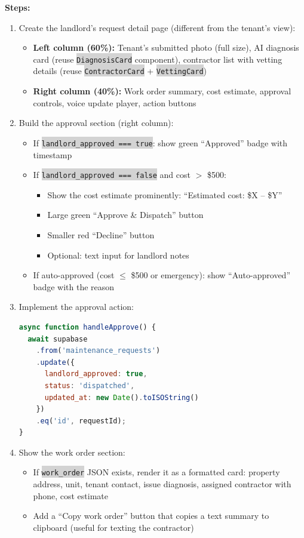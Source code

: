 \documentclass[11pt, a4paper]{article}
\newcommand{\code}[1]{\texttt{\small\colorbox{lightgray}{#1}}}
\begin{document}
\textbf{Steps:}
\begin{enumerate}[leftmargin=2em, itemsep=2pt]
  \item Create the landlord's request detail page (different from the tenant's view):
    \begin{itemize}[itemsep=1pt]
      \item \textbf{Left column (60\%):} Tenant's submitted photo (full size), AI diagnosis card (reuse \code{DiagnosisCard} component), contractor list with vetting details (reuse \code{ContractorCard} + \code{VettingCard})
      \item \textbf{Right column (40\%):} Work order summary, cost estimate, approval controls, voice update player, action buttons
    \end{itemize}

  \item Build the approval section (right column):
    \begin{itemize}[itemsep=1pt]
      \item If \code{landlord\_approved === true}: show green ``Approved'' badge with timestamp
      \item If \code{landlord\_approved === false} and cost $>$ \$500:
        \begin{itemize}[itemsep=1pt]
          \item Show the cost estimate prominently: ``Estimated cost: \$X -- \$Y''
          \item Large green ``Approve \& Dispatch'' button
          \item Smaller red ``Decline'' button
          \item Optional: text input for landlord notes
        \end{itemize}
      \item If auto-approved (cost $\leq$ \$500 or emergency): show ``Auto-approved'' badge with the reason
    \end{itemize}

  \item Implement the approval action:
\begin{lstlisting}[language=JavaScript]
async function handleApprove() {
  await supabase
    .from('maintenance_requests')
    .update({ 
      landlord_approved: true, 
      status: 'dispatched',
      updated_at: new Date().toISOString()
    })
    .eq('id', requestId);
}
\end{lstlisting}

  \item Show the work order section:
    \begin{itemize}[itemsep=1pt]
      \item If \code{work\_order} JSON exists, render it as a formatted card: property address, unit, tenant contact, issue diagnosis, assigned contractor with phone, cost estimate
      \item Add a ``Copy work order'' button that copies a text summary to clipboard (useful for texting the contractor)
    \end{itemize}
\end{enumerate}
\end{document}
